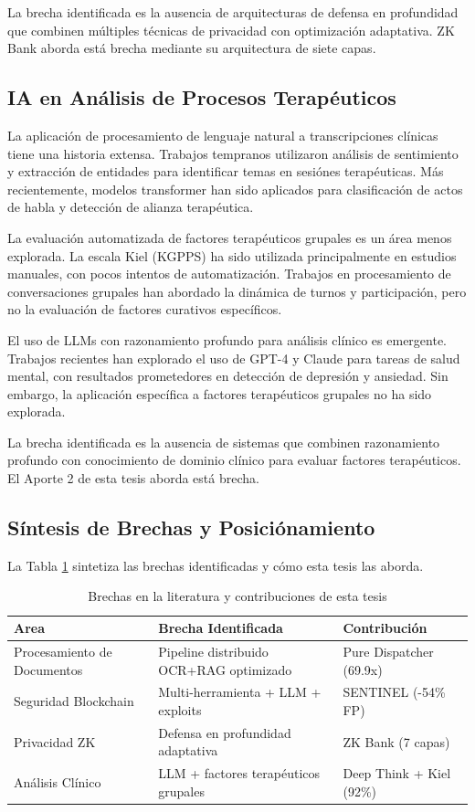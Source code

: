 \documentclass[12pt,a4paper,twoside]{book}
\begin{document}
La brecha identificada es la ausencia de arquitecturas de defensa en profundidad que combinen múltiples técnicas de privacidad con optimización adaptativa. ZK Bank aborda está brecha mediante su arquitectura de siete capas.

\subsection{IA en Análisis de Procesos Terapéuticos}

La aplicación de procesamiento de lenguaje natural a transcripciones clínicas tiene una historia extensa. Trabajos tempranos utilizaron análisis de sentimiento y extracción de entidades para identificar temas en sesiónes terapéuticas. Más recientemente, modelos transformer han sido aplicados para clasificación de actos de habla y detección de alianza terapéutica.

La evaluación automatizada de factores terapéuticos grupales es un área menos explorada. La escala Kiel (KGPPS) ha sido utilizada principalmente en estudios manuales, con pocos intentos de automatización. Trabajos en procesamiento de conversaciones grupales han abordado la dinámica de turnos y participación, pero no la evaluación de factores curativos específicos.

El uso de LLMs con razonamiento profundo para análisis clínico es emergente. Trabajos recientes han explorado el uso de GPT-4 y Claude para tareas de salud mental, con resultados prometedores en detección de depresión y ansiedad. Sin embargo, la aplicación específica a factores terapéuticos grupales no ha sido explorada.

La brecha identificada es la ausencia de sistemas que combinen razonamiento profundo con conocimiento de dominio clínico para evaluar factores terapéuticos. El Aporte 2 de esta tesis aborda está brecha.

\subsection{Síntesis de Brechas y Posiciónamiento}

La Tabla \ref{tab:brechas_literatura} sintetiza las brechas identificadas y cómo esta tesis las aborda.

\begin{table}[h]
\centering
\caption{Brechas en la literatura y contribuciones de esta tesis}
\label{tab:brechas_literatura}
\begin{tabular}{p{4cm}p{5cm}p{5cm}}
\toprule
\textbf{Area} & \textbf{Brecha Identificada} & \textbf{Contribución} \\
\midrule
Procesamiento de Documentos & Pipeline distribuido OCR+RAG optimizado & Pure Dispatcher (69.9x) \\
Seguridad Blockchain & Multi-herramienta + LLM + exploits & SENTINEL (-54\% FP) \\
Privacidad ZK & Defensa en profundidad adaptativa & ZK Bank (7 capas) \\
Análisis Clínico & LLM + factores terapéuticos grupales & Deep Think + Kiel (92\%) \\
\bottomrule
\end{tabular}
\end{table}
\end{document}
